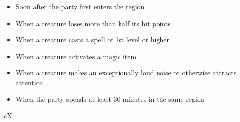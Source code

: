 \documentclass[10pt,a4paper,twoside,bg=print,twocolumn,openany,nodeprecatedcode]{dndbook}
\begin{document}
\begin{itemize}
\item Soon after the party first enters the region
\item When a creature loses more than half its hit points
\item When a creature casts a spell of 1st level or higher
\item When a creature activates a magic item
\item When a creature makes an exceptionally loud noise or otherwise attracts attention
\item When the party spends at least 30 minutes in the same region
\end{itemize}

\begin{DndTable}[header=Weird Magic Effects]{cX}


\end{DndTable}
\end{document}
